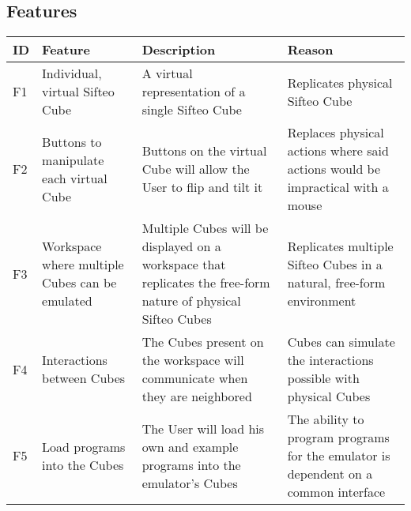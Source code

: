 \documentclass[12pt]{article}
\begin{document}


\appendix
    \begin{landscape}
    \section{Features}
    \begin{table}[h!]
      \begin{tabular}{p{.25in} | p{2.75in} | p{3in} | p{3in}}
        \textbf{ID} &
        \textbf{Feature} &
        \textbf{Description} &
        \textbf{Reason} 
        \\ \hline

        F1 &
        Individual, virtual Sifteo Cube &
        A virtual representation of a single Sifteo Cube &
        Replicates physical Sifteo Cube
        \\ \hline

        F2 &
        Buttons to manipulate each virtual Cube &
        Buttons on the virtual Cube will allow the User to flip and tilt it &
        Replaces physical actions where said actions would be impractical with a mouse
        \\ \hline

        F3 &
        Workspace where multiple Cubes can be emulated &
        Multiple Cubes will be displayed on a workspace that replicates the free-form nature of physical Sifteo Cubes\index{Sifteo Cubes} &
        Replicates multiple Sifteo Cubes\index{Sifteo Cubes} in a natural, free-form environment
        \\ \hline

        F4 &
        Interactions between Cubes &
        The Cubes present on the workspace will communicate when they are neighbored &
        Cubes can simulate the interactions possible with physical Cubes
        \\ \hline

        F5 &
        Load programs into the Cubes &
        The User will load his own and example programs into the emulator’s\index{emulator} Cubes &
        The ability to program programs for the emulator\index{emulator} is dependent on a common interface
        \\ \hline


\end{tabular}
\end{table}
\end{landscape}
\end{document}
